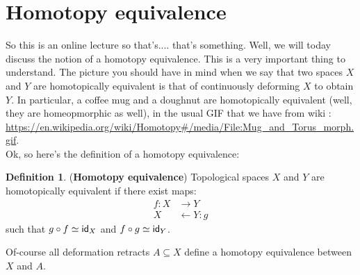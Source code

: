 \documentclass[letterpaper,11pt,twoside]{article}
\theoremstyle{definition}
\theoremstyle{definition}
\newtheorem{definition}[proposition]{Definition}
\theoremstyle{definition}
\theoremstyle{definition}
\theoremstyle{definition}
\theoremstyle{definition}
\theoremstyle{remark}
\theoremstyle{definition}
\newcommand{\id}[1]{{\fontfamily{lmss}\selectfont 
		\text{id}_{#1}
}}
\begin{document}
    \section{Homotopy equivalence}
	So this is an online lecture so that's.... that's something. Well, we will today discuss the notion of a homotopy equivalence. This is a very important thing to understand. The picture you should have in mind when we say that two spaces $X$ and $Y$ are homotopically equivalent is that of continuously deforming $X$ to obtain $Y$. In particular, a coffee mug and a doughnut are homotopically equivalent (well, they are homeopmorphic as well), in the usual GIF that we have from wiki : \url{https://en.wikipedia.org/wiki/Homotopy#/media/File:Mug_and_Torus_morph.gif}.\\
	Ok, so here's the definition of a homotopy equivalence:
	\begin{definition}
	(\textbf{Homotopy equivalence}) Topological spaces $X$ and $Y$ are homotopically equivalent if there exist maps:
	\begin{align*}
	    f : X&\longrightarrow Y\\
	     X&\longleftarrow Y : g 
	\end{align*}
	such that $g \circ f \simeq \id{X}$ and $f\circ g \simeq \id{Y}$. 
	\end{definition}
	Of-course all deformation retracts $A\subseteq X$ define a homotopy equivalence between $X$ and $A$.\\
	
\end{document}
